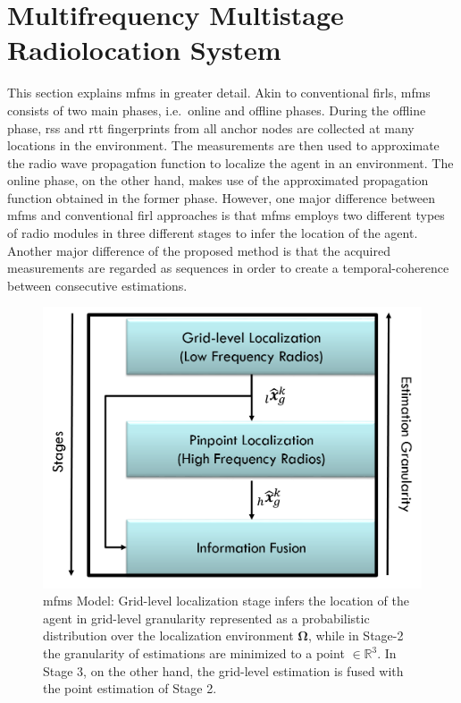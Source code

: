 \section{Multifrequency Multistage Radiolocation System}
\label{sec:mfms}
    This section explains \gls{mfms} in greater detail.
    Akin to conventional \gls{firl}s, \gls{mfms} consists of two main phases, i.e.\ online and offline phases.
    During the offline phase, \gls{rss} and \gls{rtt} fingerprints from all anchor nodes are collected at many locations in the environment.
    The measurements are then used to approximate the radio wave propagation function to localize the agent in an environment.
    The online phase, on the other hand, makes use of the approximated propagation function obtained in the former phase.
    However, one major difference between \gls{mfms} and conventional \gls{firl} approaches is that \gls{mfms} employs two different types of radio modules in three different stages to infer the location of the agent.
    Another major difference of the proposed method is that the acquired measurements are regarded as sequences in order to create a temporal-coherence between consecutive estimations.

    \begin{figure}[thpb]
      \centering
      \includegraphics[width=\linewidth]{figures/mfms.png}
      \caption{\label{fig:mfms-model}\gls{mfms} Model: Grid-level localization stage infers the location of the agent in grid-level granularity represented as a probabilistic distribution over the localization environment $\bm{\Omega}$, while in Stage-2 the granularity of estimations are minimized to a point $\in \mathbb{R}^3$.
      In Stage 3, on the other hand, the grid-level estimation is fused with the point estimation of Stage 2.}
    \end{figure}

